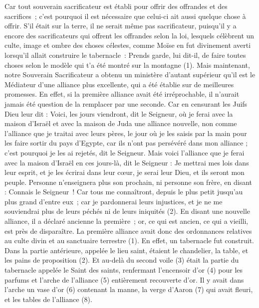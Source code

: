 \begin{multicols}{2}
Car tout souverain sacrificateur est établi pour offrir des offrandes et des sacrifices ; c'est pourquoi il est nécessaire que celui-ci ait aussi quelque chose à offrir.
S’il était sur la terre, il ne serait même pas sacrificateur, puisqu’il y a encore des sacrificateurs qui offrent les offrandes selon la loi,
lesquels célèbrent un culte, image et ombre des choses célestes, comme Moïse en fut divinement averti lorsqu’il allait construire le tabernacle : Prends garde, lui dit-il, de faire toutes choses selon le modèle qui t'a été montré sur la montagne (1).
Mais maintenant, notre Souverain Sacrificateur a obtenu un ministère d'autant supérieur qu'il est le Médiateur d'une alliance plus excellente, qui a été établie sur de meilleures promesses.
En effet, si la première alliance avait été irréprochable, il n’aurait jamais été question de la remplacer par une seconde.
Car en censurant les Juifs Dieu leur dit : Voici, les jours viendront, dit le Seigneur, où je ferai avec la maison d'Israël et avec la maison de Juda une alliance nouvelle,
non comme l'alliance que je traitai avec leurs pères, le jour où je les saisis par la main pour les faire sortir du pays d'Egypte, car ils n'ont pas persévéré dans mon alliance ; c'est pourquoi je les ai rejetés, dit le Seigneur.
Mais voici l'alliance que je ferai avec la maison d'Israël en ces jours-là, dit le Seigneur : Je mettrai mes lois dans leur esprit, et je les écrirai dans leur cœur, je serai leur Dieu, et ils seront mon peuple.
Personne n'enseignera plus son prochain, ni personne son frère, en disant : Connais le Seigneur ! Car tous me connaîtront, depuis le plus petit jusqu'au plus grand d'entre eux ;
car je pardonnerai leurs injustices, et je ne me souviendrai plus de leurs péchés ni de leurs iniquités (2).
En disant une nouvelle alliance, il a déclaré ancienne la première ; or, ce qui est ancien, ce qui a vieilli, est près de disparaître.
\VerseOne{}La première alliance avait donc des ordonnances relatives au culte divin et au sanctuaire terrestre (1).
En effet, un tabernacle fut construit. Dans la partie antérieure, appelée le lieu saint, étaient le chandelier, la table, et les pains de proposition (2).
Et au-delà du second voile (3) était la partie du tabernacle appelée le Saint des saints,
renfermant l’encensoir d'or (4) pour les parfums et l'arche de l'alliance (5) entièrement recouverte d'or. Il y avait dans l’arche un vase d'or (6) contenant la manne, la verge d'Aaron (7) qui avait fleuri, et les tables de l'alliance (8).

\end{multicols}
